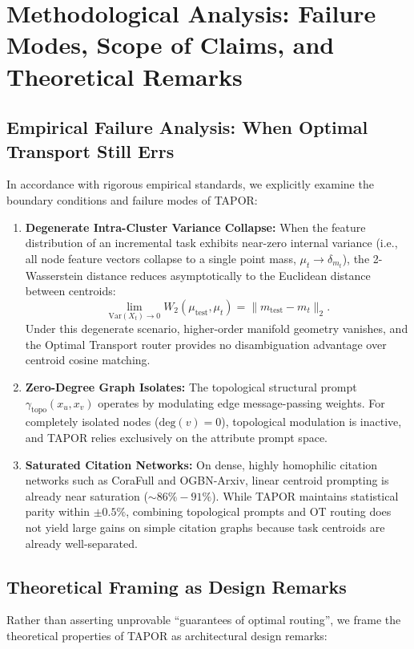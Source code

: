 \section{Methodological Analysis: Failure Modes, Scope of Claims, and Theoretical Remarks}
\label{sec:failure_analysis}

\subsection{Empirical Failure Analysis: When Optimal Transport Still Errs}
In accordance with rigorous empirical standards, we explicitly examine the boundary conditions and failure modes of TAPOR:

\begin{enumerate}
    \item \textbf{Degenerate Intra-Cluster Variance Collapse:} When the feature distribution of an incremental task exhibits near-zero internal variance (i.e., all node feature vectors collapse to a single point mass, $\mu_t \to \delta_{m_t}$), the 2-Wasserstein distance reduces asymptotically to the Euclidean distance between centroids:
    \begin{equation}
        \lim_{\mathrm{Var}(X_t) \to 0} W_2(\mu_{\mathrm{test}}, \mu_t) = \|m_{\mathrm{test}} - m_t\|_2.
    \end{equation}
    Under this degenerate scenario, higher-order manifold geometry vanishes, and the Optimal Transport router provides no disambiguation advantage over centroid cosine matching.
    
    \item \textbf{Zero-Degree Graph Isolates:} The topological structural prompt $\gamma_{\mathrm{topo}}(x_u, x_v)$ operates by modulating edge message-passing weights. For completely isolated nodes ($\mathrm{deg}(v) = 0$), topological modulation is inactive, and TAPOR relies exclusively on the attribute prompt space.
    
    \item \textbf{Saturated Citation Networks:} On dense, highly homophilic citation networks such as CoraFull and OGBN-Arxiv, linear centroid prompting is already near saturation ($\sim 86\% - 91\%$). While TAPOR maintains statistical parity within $\pm 0.5\%$, combining topological prompts and OT routing does not yield large gains on simple citation graphs because task centroids are already well-separated.
\end{enumerate}

\subsection{Theoretical Framing as Design Remarks}
Rather than asserting unprovable ``guarantees of optimal routing'', we frame the theoretical properties of TAPOR as architectural design remarks:

